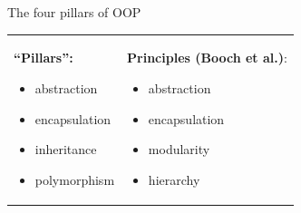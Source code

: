 \documentclass{beamer}
\begin{document}
{ %
  \begin{frame}[plain]
  \end{frame}
}

\begin{frame}{The four pillars of OOP}
  \begin{tabularx}{\textwidth}{ X X }
    \textbf{``Pillars'':} \pause \newline
    \begin{itemize}
    \item abstraction \pause
    \item encapsulation \pause
    \item inheritance \pause
    \item polymorphism \pause
    \end{itemize}
    &
    \textbf{Principles (Booch et al.)}: \pause \newline
    \begin{itemize}
    \item abstraction \pause
    \item encapsulation \pause
    \item modularity \pause
    \item hierarchy
    \end{itemize}
  \end{tabularx}
\end{frame}
\end{document}
